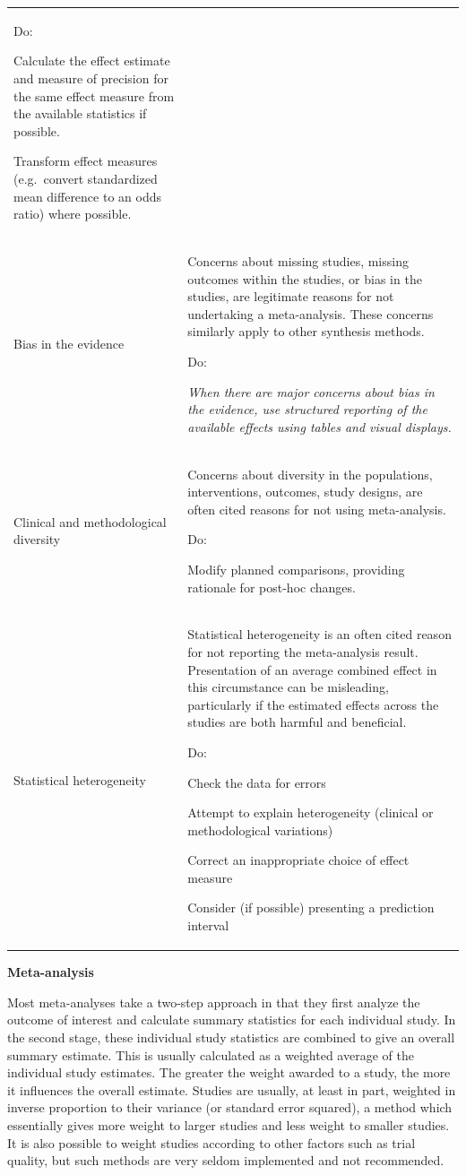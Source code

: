 \documentclass[
  10pt,
  a4paper,
  DIV=11,
  numbers=noendperiod]{scrreprt}
\begin{document}
\begin{longtable}[]{@{}
  >{\raggedright\arraybackslash}p{}
  >{\raggedright\arraybackslash}p{}@{}}
Do:

Calculate the effect estimate and measure of precision for the same
effect measure from the available statistics if possible.

Transform effect measures (e.g.~convert standardized mean difference to
an odds ratio) where possible. \\
Bias in the evidence & Concerns about missing studies, missing outcomes
within the studies, or bias in the studies, are legitimate reasons for
not undertaking a meta-analysis. These concerns similarly apply to other
synthesis methods.

Do:

\emph{When there are major concerns about bias in the evidence, use
structured reporting of the available effects using tables and visual
displays.} \\
Clinical and methodological diversity & Concerns about diversity in the
populations, interventions, outcomes, study designs, are often cited
reasons for not using meta-analysis.

Do:

Modify planned comparisons, providing rationale for post-hoc changes. \\
Statistical heterogeneity & Statistical heterogeneity is an often cited
reason for not reporting the meta-analysis result. Presentation of an
average combined effect in this circumstance can be misleading,
particularly if the estimated effects across the studies are both
harmful and beneficial.

Do:

Check the data for errors

Attempt to explain heterogeneity (clinical or methodological variations)

Correct an inappropriate choice of effect measure

Consider (if possible) presenting a prediction interval \\
\end{longtable}

\textbf{Meta-analysis}

Most meta-analyses take a two-step approach in that they first analyze
the outcome of interest and calculate summary statistics for each
individual study. In the second stage, these individual study statistics
are combined to give an overall summary estimate. This is usually
calculated as a weighted average of the individual study estimates. The
greater the weight awarded to a study, the more it influences the
overall estimate. Studies are usually, at least in part, weighted in
inverse proportion to their variance (or standard error squared), a
method which essentially gives more weight to larger studies and less
weight to smaller studies. It is also possible to weight studies
according to other factors such as trial quality, but such methods are
very seldom implemented and not recommended.
\end{document}
